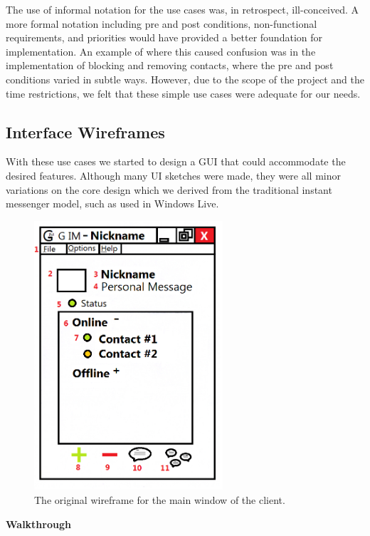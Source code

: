 The use of informal notation for the use cases was, in retrospect, ill-conceived. A more formal notation including pre and post conditions, non-functional requirements, and priorities would have provided a better foundation for implementation. An example of where this caused confusion was in the implementation of blocking and removing contacts, where the pre and post conditions varied in subtle ways. However, due to the scope of the project and the time restrictions, we felt that these simple use cases were adequate for our needs.

\subsection{Interface Wireframes}

With these use cases we started to design a GUI that could accommodate the desired features. Although many UI sketches were made, they were all minor variations on the core design which we derived from the traditional instant messenger model, such as used in Windows Live.

\begin{figure}[!h]
    \begin{center}
        \includegraphics[width=7cm]{Design/diagrams/Main_UI.png}
        \caption{The original wireframe for the main window of the client.}
        \label{mainui}
    \end{center}
\end{figure}

{\bf Walkthrough}

